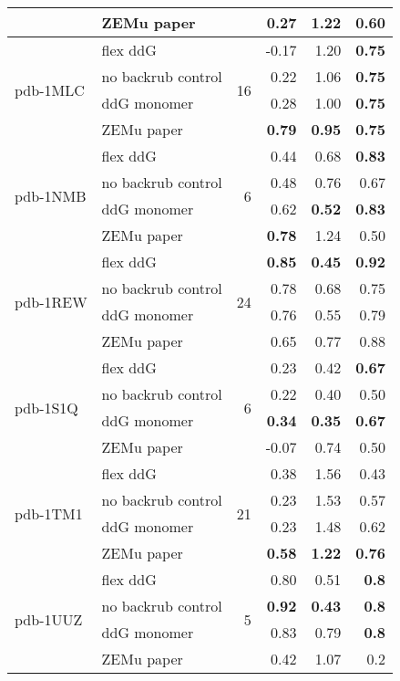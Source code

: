 \begin{longtable}{llrrrr}
 & ZEMu paper & & 0.27 & 1.22 & 0.60  \\
\hline
 \multirow{ 4}{*}{pdb-1MLC} & flex ddG & \multirow{ 4}{*}{16} & -0.17 & 1.20 & \textbf{0.75}  \\
 & no backrub control & & 0.22 & 1.06 & \textbf{0.75}  \\
 & ddG monomer & & 0.28 & 1.00 & \textbf{0.75}  \\
 & ZEMu paper & & \textbf{0.79} & \textbf{0.95} & \textbf{0.75}  \\
\hline
 \multirow{ 4}{*}{pdb-1NMB} & flex ddG & \multirow{ 4}{*}{6} & 0.44 & 0.68 & \textbf{0.83}  \\
 & no backrub control & & 0.48 & 0.76 & 0.67  \\
 & ddG monomer & & 0.62 & \textbf{0.52} & \textbf{0.83}  \\
 & ZEMu paper & & \textbf{0.78} & 1.24 & 0.50  \\
\hline
 \multirow{ 4}{*}{pdb-1REW} & flex ddG & \multirow{ 4}{*}{24} & \textbf{0.85} & \textbf{0.45} & \textbf{0.92}  \\
 & no backrub control & & 0.78 & 0.68 & 0.75  \\
 & ddG monomer & & 0.76 & 0.55 & 0.79  \\
 & ZEMu paper & & 0.65 & 0.77 & 0.88  \\
\hline
 \multirow{ 4}{*}{pdb-1S1Q} & flex ddG & \multirow{ 4}{*}{6} & 0.23 & 0.42 & \textbf{0.67}  \\
 & no backrub control & & 0.22 & 0.40 & 0.50  \\
 & ddG monomer & & \textbf{0.34} & \textbf{0.35} & \textbf{0.67}  \\
 & ZEMu paper & & -0.07 & 0.74 & 0.50  \\
\hline
 \multirow{ 4}{*}{pdb-1TM1} & flex ddG & \multirow{ 4}{*}{21} & 0.38 & 1.56 & 0.43  \\
 & no backrub control & & 0.23 & 1.53 & 0.57  \\
 & ddG monomer & & 0.23 & 1.48 & 0.62  \\
 & ZEMu paper & & \textbf{0.58} & \textbf{1.22} & \textbf{0.76}  \\
\hline
 \multirow{ 4}{*}{pdb-1UUZ} & flex ddG & \multirow{ 4}{*}{5} & 0.80 & 0.51 & \textbf{0.8}  \\
 & no backrub control & & \textbf{0.92} & \textbf{0.43} & \textbf{0.8}  \\
 & ddG monomer & & 0.83 & 0.79 & \textbf{0.8}  \\
 & ZEMu paper & & 0.42 & 1.07 & 0.2  \\

\end{longtable}
